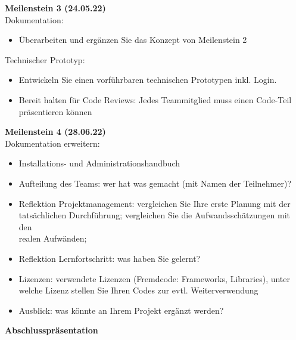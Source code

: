 \vspace{0.1\textwidth}

\textbf{Meilenstein 3 (24.05.22)} \\
Dokumentation: 
\begin{itemize}
    \item Überarbeiten und ergänzen Sie das Konzept von Meilenstein 2
\end{itemize}
Technischer Prototyp: 
\begin{itemize}
    \item Entwickeln Sie einen vorführbaren technischen Prototypen inkl. Login.
    \item Bereit halten für Code Reviews: Jedes Teammitglied muss einen Code-Teil \\präsentieren können
\end{itemize}


\textbf{Meilenstein 4 (28.06.22)}\\
Dokumentation erweitern:\\
\begin{itemize}
    \item Installations- und Administrationshandbuch
    \item Aufteilung des Teams: wer hat was gemacht (mit Namen der Teilnehmer)?
    \item Reflektion Projektmanagement: vergleichen Sie Ihre erste Planung mit der \\ tatsächlichen Durchführung; vergleichen Sie die Aufwandsschätzungen mit den \\realen Aufwänden;
    \item Reflektion Lernfortschritt: was haben Sie gelernt?
    \item Lizenzen: verwendete Lizenzen (Fremdcode: Frameworks, Libraries), unter \\ welche Lizenz stellen Sie Ihren Codes zur evtl. Weiterverwendung
    \item Ausblick: was könnte an Ihrem Projekt ergänzt werden?
\end{itemize}

\textbf{Abschlusspräsentation}